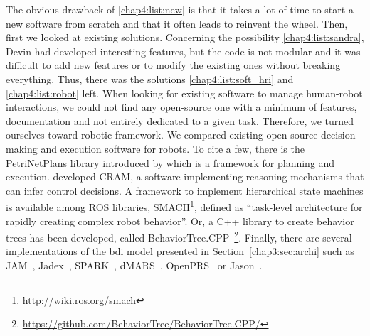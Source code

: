 \documentclass[a4paper,11pt,twoside]{StyleThese}
\begin{document}
The obvious drawback of \ref{chap4:list:new} is that it takes a lot of time to start a new software from scratch and that it often leads to reinvent the wheel. Then, first we looked at existing solutions. Concerning the possibility \ref{chap4:list:sandra}, Devin had developed interesting features, but the code is not modular and it was difficult to add new features or to modify the existing ones without breaking everything. Thus, there was the solutions \ref{chap4:list:soft_hri} and \ref{chap4:list:robot} left. When looking for existing software to manage human-robot interactions, we could not find any open-source one with a minimum of features, documentation and not entirely dedicated to a given task. Therefore, we turned ourselves toward robotic framework. We compared existing open-source decision-making and execution software for robots. To cite a few, there is the PetriNetPlans library introduced by \cite{ziparo_2011_petri} which is a framework for planning and execution. \cite{beetz_2010_cram} developed CRAM, a software implementing reasoning mechanisms that can infer control decisions. A framework to implement hierarchical state machines is available among ROS libraries, SMACH\footnote{\url{http://wiki.ros.org/smach}}, defined as ``task-level architecture for rapidly creating complex robot behavior''. Or, a C++ library to create behavior trees has been developed, called BehaviorTree.CPP~\footnote{\url{https://github.com/BehaviorTree/BehaviorTree.CPP/}}. Finally, there are several implementations of the \acrshort{bdi} model presented in Section~\ref{chap3:sec:archi} such as JAM~\citep{huber_1999_jam}, Jadex~\citep{braudach_2005_jadex}, SPARK~\citep{morley_2004_spark}, dMARS~\citep{dinverno_1998_formal}, OpenPRS~\citep{ingrand_1996_prs} or Jason~\citep{bordini_2007_jason}. 
\end{document}
